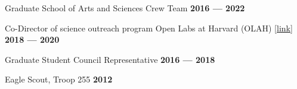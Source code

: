 Graduate School of Arts and Sciences Crew Team \hfill \textbf{2016 --- 2022}

Co-Director of science outreach program Open Labs at Harvard (OLAH) \href{https://www.theopenlabs.org/harvard}{[link]} \hfill \textbf{2018 --- 2020}

Graduate Student Council Representative \hfill \textbf{2016 --- 2018}

Eagle Scout, Troop 255 \hfill \textbf{2012} \\